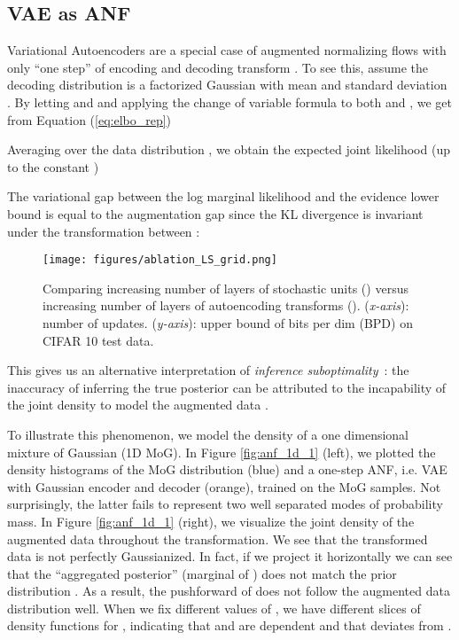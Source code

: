 \documentclass{article}
\begin{document}
\subsection{VAE as ANF}
Variational Autoencoders are a special case of augmented normalizing flows with only ``one step'' of encoding and decoding transform \citep{dinh2014nice}. 
To see this, assume the decoding distribution  is a factorized Gaussian with mean  and standard deviation .
By letting  and  and applying the change of variable formula to both  and , we get from Equation (\ref{eq:elbo_rep}) 
\begingroup\makeatletter\def\f@size{8.501}\check@mathfonts
\def\maketag@@@#1{\hbox{\m@th\large\normalfont#1}}

\endgroup

Averaging over the data distribution , we obtain the expected joint likelihood (up to the constant )


The variational gap between the log marginal likelihood and the evidence lower bound is equal to the augmentation gap since the KL divergence is invariant under the transformation between :



\begin{figure}
    \centering
    \texttt{[image: figures/ablation\_LS\_grid.png]}
    \vspace{-7mm}
    \caption{\small Comparing increasing number of layers of stochastic units () versus increasing number of layers of autoencoding transforms (). (\emph{x-axis}): number of updates. (\emph{y-axis}): upper bound of bits per dim (BPD) on CIFAR 10 test data.
    }
    \label{fig:layers}
\end{figure}


This gives us an alternative interpretation of \emph{inference suboptimality}~\citep{cremer2018inference}: the inaccuracy of inferring the true posterior  can be attributed to the incapability of the joint density to model the augmented data . 

To illustrate this phenomenon, we model the density of a one dimensional mixture of Gaussian (1D MoG).
In Figure \ref{fig:anf_1d_1} (left), we plotted the density histograms of the MoG distribution (blue) and a one-step ANF, i.e. VAE with Gaussian encoder and decoder (orange), trained on the MoG samples. 
Not surprisingly, the latter fails to represent two well separated modes of probability mass. 
In Figure \ref{fig:anf_1d_1} (right), we visualize the joint density of the augmented data  throughout the transformation. 
We see that the transformed data  is not perfectly Gaussianized.
In fact, if we project it horizontally we can see that the ``aggregated posterior'' (marginal of ) does not match the prior distribution . 
As a result, the pushforward  of  does not follow the augmented data distribution  well. 
When we fix different values of , we have different slices of density functions for , indicating that  and  are dependent and that  deviates from . 
\end{document}
